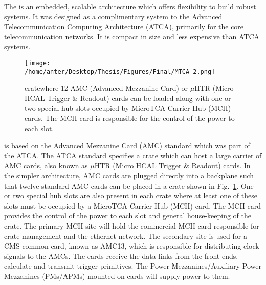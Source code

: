 The \mtca is an embedded, scalable architecture which offers flexibility to build robust systems. It was designed as a complimentary system to the Advanced Telecommunication Computing Architecture (ATCA), primarily for the core telecommunication networks. It is compact in size and less expensive than ATCA systems.\begin{figure}[!h]
\begin{center}
\vspace*{3mm}
\hspace*{-5mm}
\texttt{[image: /home/anter/Desktop/Thesis/Figures/Final/MTCA\_2.png]}\\
\vspace*{4mm}
\caption[\mtca crate showing the different slots.]{\mtca crate\footnotemark where 12 AMC (Advanced Mezzanine Card) or $\mu$HTR (Micro HCAL Trigger \& Readout) cards can be loaded along with one or two special hub slots occupied by MicroTCA Carrier Hub (MCH) cards. The MCH card is responsible for the control of the power to each slot.}
\label{fig:MTCA}
\end{center}
\end{figure} \mtca is based on the Advanced Mezzanine Card (AMC) standard which was part of the ATCA. The ATCA standard specifies a crate which can host a large carrier of AMC cards, also known as $\mu$HTR (Micro HCAL Trigger \& Readout) cards. In the simpler \mtca architecture, AMC cards are plugged directly into a backplane such that twelve standard AMC cards can be placed in a crate shown in Fig.~\ref{fig:MTCA}. One or two special hub slots are also present in each crate where at least one of these slots must be occupied by a MicroTCA Carrier Hub (MCH) card. The MCH card provides the control of the power to each slot and general house-keeping of the crate. The primary MCH site will hold the commercial MCH card responsible for crate management and the ethernet network. The secondary site is used for a CMS-common card, known as AMC13, which is responsible for distributing clock signals to the AMCs. The \mhtr cards receive the data links from the front-ends, calculate and transmit trigger primitives. The Power Mezzanines/Auxiliary Power Mezzanines (PMs/APMs) mounted on \mhtr cards will supply power to them.  

